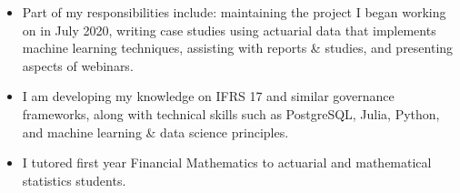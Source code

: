 \documentclass[10pt,a4paper]{altacv}
\begin{document}

%

\begin{fullwidth}
%
\makecvheader
%
\end{fullwidth}

%







\begin{itemize}
    \setlength{\itemindent}{0.5em}
  \item \small{Part of my responsibilities include: maintaining the project I began working on in July 2020, writing case studies using actuarial data that implements machine learning techniques, assisting with reports \& studies, and presenting aspects of webinars.}
  \item \small{I am developing my knowledge on IFRS 17 and similar governance frameworks, along with technical skills such as PostgreSQL, Julia, Python, and machine learning \& data science principles.}
\end{itemize}
\medskip



\begin{itemize}
    \setlength{\itemindent}{0.5em}
  \item \small{I tutored first year Financial Mathematics to actuarial and mathematical statistics students.}
\end{itemize}

\end{document}
